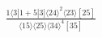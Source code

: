 \documentclass[varwidth, border=5pt]{standalone}
\begin{document}
\begin{my}
$\begin{gathered}
\scriptscriptstyle\frac{1⟨3|1+5|3]⟨24⟩^2⟨23⟩[25]}{⟨15⟩⟨25⟩⟨34⟩^4[35]}
\end{gathered}$
\end{my}
\end{document}
